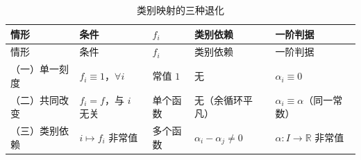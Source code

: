 \documentclass[
  chinese,
  a4paper,
  UTF8,
  12pt,
  oneside,
  openany]{ctexbook}
\theoremstyle{plain}
\theoremstyle{plain}
\theoremstyle{plain}
\theoremstyle{definition}
\theoremstyle{plain}
\theoremstyle{plain}
\theoremstyle{remark}
\begin{document}
\begin{longtable}[]{@{}
  >{\raggedright\arraybackslash}p{}
  >{\raggedright\arraybackslash}p{}
  >{\raggedright\arraybackslash}p{}
  >{\raggedright\arraybackslash}p{}
  >{\raggedright\arraybackslash}p{}@{}}
\caption{类别映射的三种退化}\label{tbl-degenerations}\tabularnewline
\toprule\noalign{}
\begin{minipage}[b]{\linewidth}\raggedright
情形
\end{minipage} & \begin{minipage}[b]{\linewidth}\raggedright
条件
\end{minipage} & \begin{minipage}[b]{\linewidth}\raggedright
\(f_i\)
\end{minipage} & \begin{minipage}[b]{\linewidth}\raggedright
类别依赖
\end{minipage} & \begin{minipage}[b]{\linewidth}\raggedright
一阶判据
\end{minipage} \\
\midrule\noalign{}
\endfirsthead
\toprule\noalign{}
\begin{minipage}[b]{\linewidth}\raggedright
情形
\end{minipage} & \begin{minipage}[b]{\linewidth}\raggedright
条件
\end{minipage} & \begin{minipage}[b]{\linewidth}\raggedright
\(f_i\)
\end{minipage} & \begin{minipage}[b]{\linewidth}\raggedright
类别依赖
\end{minipage} & \begin{minipage}[b]{\linewidth}\raggedright
一阶判据
\end{minipage} \\
\midrule\noalign{}
\endhead
\bottomrule\noalign{}
\endlastfoot
（一）单一刻度 & \(f_i\equiv1\)，\(\forall i\) & 常值 \(1\) & 无 &
\(\alpha_i\equiv0\) \\
（二）共同改变 & \(f_i=f\)，与 \(i\) 无关 & 单个函数 & 无（余循环平凡）
& \(\alpha_i\equiv\alpha\)（同一常数） \\
（三）类别依赖 & \(i\mapsto f_i\) 非常值 & 多个函数 &
\(\alpha_i-\alpha_j\neq0\) & \(\alpha:I\to\mathbb{R}\) 非常值 \\
\end{longtable}
\end{document}
